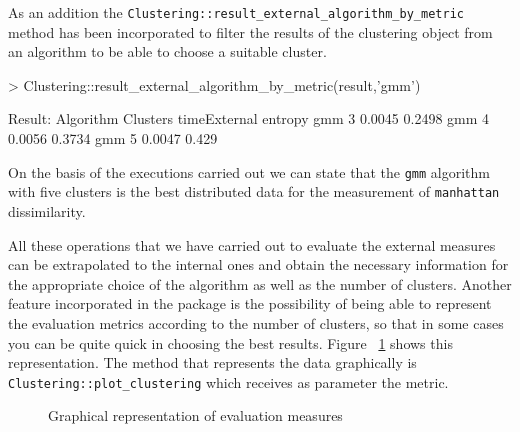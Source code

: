 As an addition the \texttt{Clustering::result\_external\_algorithm\_by\_metric} method has been incorporated to filter the results of the clustering object from an algorithm to be able to choose a suitable cluster.

\begin{Schunk}
\begin{Sinput}
> Clustering::result_external_algorithm_by_metric(result,'gmm')
\end{Sinput}
\begin{Soutput}
Result:
Algorithm Clusters timeExternal entropy
    gmm      3       0.0045      0.2498
    gmm      4       0.0056      0.3734
    gmm      5       0.0047      0.429
\end{Soutput}
\end{Schunk}

On the basis of the executions carried out we can state that the \texttt{gmm} algorithm with five clusters is the best distributed data for the measurement of \texttt{manhattan} dissimilarity.

All these operations that we have carried out to evaluate the external measures can be extrapolated to the internal ones and obtain the necessary information for the appropriate choice of the algorithm as well as the number of clusters. Another feature incorporated in the package is the possibility of being able to represent the evaluation metrics according to the number of clusters, so that in some cases you can be quite quick in choosing the best results. Figure ~\ref{fig:clustering} shows this representation. The method that represents the data graphically is \texttt{Clustering::plot\_clustering} which receives as parameter the metric.

\begin{figure}[htbp]
  \centering
    \qquad
    \caption{Graphical representation of evaluation measures}%
    \label{fig:clustering}%
\end{figure}

